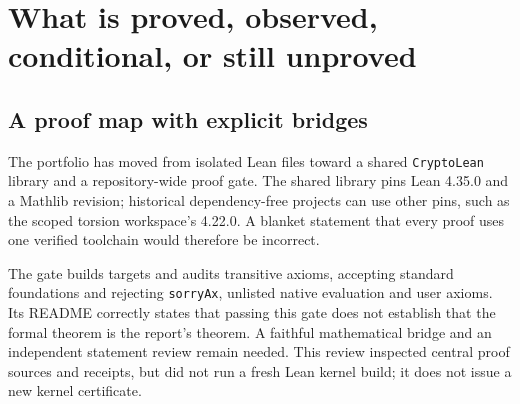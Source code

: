 \section{What is proved, observed, conditional, or still unproved}\label{sec:proofs}

\subsection{A proof map with explicit bridges}

The portfolio has moved from isolated Lean files toward a shared
\texttt{CryptoLean} library and a repository-wide proof gate. The shared
library pins Lean 4.35.0 and a Mathlib revision; historical dependency-free
projects can use other pins, such as the scoped torsion workspace's
4.22.0. A blanket statement that every proof uses one verified toolchain
would therefore be incorrect.

The gate builds targets and audits transitive axioms, accepting standard
foundations and rejecting \texttt{sorryAx}, unlisted native evaluation and
user axioms. Its README correctly states that passing this gate does
not establish that the formal theorem is the report's theorem. A faithful
mathematical bridge and an independent statement review remain needed.
This review inspected central proof sources and receipts, but did not
run a fresh Lean kernel build; it does not issue a new kernel certificate.

